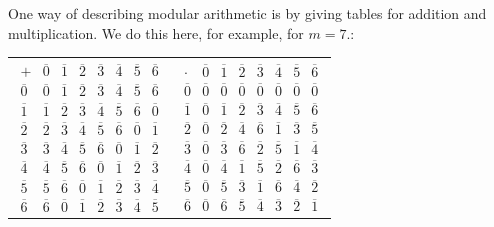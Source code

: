 One way of describing modular arithmetic is by giving tables for addition and
multiplication. We do this here, for example, for $m=7$.:
\begin{center}
\begin{tabular}{cc}
$\begin{array}{c|ccccccc}
+&\overline{0}&\overline{1}&\overline{2}&\overline{3}&\overline{4}&\overline{5}&\overline{6}\\
\hline
\overline{0}&\overline{0}&\overline{1}&\overline{2}&\overline{3}&\overline{4}&\overline{5}&\overline{6}\\
\overline{1}&\overline{1}&\overline{2}&\overline{3}&\overline{4}&\overline{5}&\overline{6}&\overline{0}\\
\overline{2}&\overline{2}&\overline{3}&\overline{4}&\overline{5}&\overline{6}&\overline{0}&\overline{1}\\
\overline{3}&\overline{3}&\overline{4}&\overline{5}&\overline{6}&\overline{0}&\overline{1}&\overline{2}\\
\overline{4}&\overline{4}&\overline{5}&\overline{6}&\overline{0}&\overline{1}&\overline{2}&\overline{3}\\
\overline{5}&\overline{5}&\overline{6}&\overline{0}&\overline{1}&\overline{2}&\overline{3}&\overline{4}\\
\overline{6}&\overline{6}&\overline{0}&\overline{1}&\overline{2}&\overline{3}&\overline{4}&\overline{5}
\end{array}$
&
$\begin{array}{c|ccccccc}
\cdot&\overline{0}&\overline{1}&\overline{2}&\overline{3}&\overline{4}&\overline{5}&\overline{6}\\
\hline
\overline{0}&\overline{0}&\overline{0}&\overline{0}&\overline{0}&\overline{0}&\overline{0}&\overline{0}\\
\overline{1}&\overline{0}&\overline{1}&\overline{2}&\overline{3}&\overline{4}&\overline{5}&\overline{6}\\
\overline{2}&\overline{0}&\overline{2}&\overline{4}&\overline{6}&\overline{1}&\overline{3}&\overline{5}\\
\overline{3}&\overline{0}&\overline{3}&\overline{6}&\overline{2}&\overline{5}&\overline{1}&\overline{4}\\
\overline{4}&\overline{0}&\overline{4}&\overline{1}&\overline{5}&\overline{2}&\overline{6}&\overline{3}\\
\overline{5}&\overline{0}&\overline{5}&\overline{3}&\overline{1}&\overline{6}&\overline{4}&\overline{2}\\
\overline{6}&\overline{0}&\overline{6}&\overline{5}&\overline{4}&\overline{3}&\overline{2}&\overline{1}
\end{array}$
\end{tabular}
\end{center}

